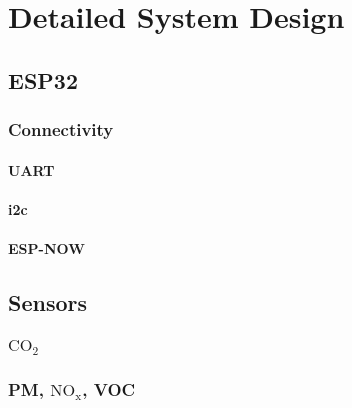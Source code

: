 \chapter{Detailed System Design}
\section{ESP32}
\subsection{Connectivity}

\subsubsection{UART}

\subsubsection{i2c}

\subsubsection{ESP-NOW}



\section{Sensors}
\subsection{$\mathrm{CO_2}$}




\subsection{PM, $\mathrm{NO_x}$, VOC}
